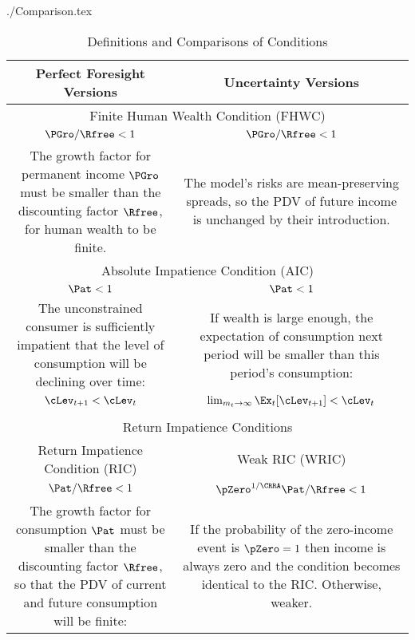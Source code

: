 \documentclass[titlepage,abstract]{bejournal}
\begin{document}
\begin{verbatimwrite}{./Comparison.tex}
\begin{table}[!th]
\caption{Definitions and Comparisons of Conditions}\label{table:Comparison}
\begin{center}
\begin{tabular}{|c|c|}\hline
Perfect Foresight Versions & Uncertainty Versions\\ \hline
\multicolumn{2}{|c|}{Finite Human Wealth Condition (FHWC)} \\ \hline
$\PGro/\Rfree < 1$                                                          & $\PGro/\Rfree < 1$ \\
\multirow{3}{75mm}{The growth factor for permanent income $\PGro$ must be smaller than the discounting factor $\Rfree$, for human wealth to be finite.} &
\multirow{3}{75mm}{The model's risks are mean-preserving spreads, so the PDV of future income is unchanged by their introduction.} \\
&  \\
&  \\ \hline
\multicolumn{2}{|c|}{Absolute Impatience Condition (AIC)} \\ \hline
$\Pat < 1$                                        &  $\Pat < 1$ \\
\multirow{4}{75mm}{The unconstrained consumer is sufficiently impatient that the level of consumption will be declining over time:} &
\multirow{4}{75mm}{If wealth is large enough, the expectation of consumption next period will be smaller than this period's consumption:} \\
& \\
& \\
& \\
$\cLev_{t+1} < \cLev_{t}$ & $\lim_{m_{t} \rightarrow \infty} \Ex_{t} [\cLev_{t+1}] < \cLev_{t}$ \\
& \\ \hline
\multicolumn{2}{|c|}{Return Impatience Conditions} \\ \hline
\multicolumn{1}{|c|}{Return Impatience Condition (RIC)} & \multicolumn{1}{c|}{Weak RIC (WRIC)} \\ \hline
$\Pat/\Rfree < 1$                                          & $\pZero^{1/\CRRA}\Pat/\Rfree < 1$ \\
\multirow{3}{75mm}{The growth factor for consumption $\Pat$ must be smaller than the discounting factor $\Rfree$, so that the PDV of current and future consumption will be finite:}  &
\multirow{3}{75mm}{If the probability of the zero-income event is $\pZero=1$ then income is always zero and the condition becomes identical to the RIC.  Otherwise, weaker.} \\

\end{tabular}
\end{center}
\end{table}
\end{verbatimwrite}
\end{document}

